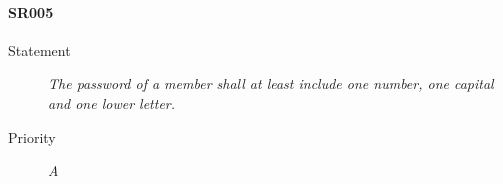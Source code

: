 \paragraph{SR005}
  \begin{description}
  \item [Statement] 
    \textit{ The password of a member shall at least include one number, one capital and one lower letter.}
  \item [Priority] \textit{A}
\end{description}
